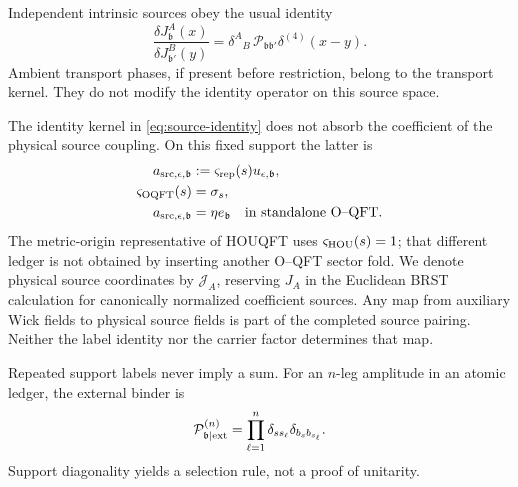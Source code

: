 \documentclass[final,5p,times,twocolumn,numbers,nopreprintline]{elsarticle}
\numberwithin{equation}{section}
\theoremstyle{definition}
\theoremstyle{remark}
\newcommand{\bb}{\mathfrak b}
\newcommand{\ee}{e_{\bb}}
\begin{document}
Independent intrinsic sources obey the usual identity
\begin{equation}
 \frac{\delta J^A_{\bb}(x)}{\delta J^B_{\bb'}(y)}
   =\delta^A{}_B\,\mathcal P_{\bb\bb'}\delta^{(4)}(x-y).
 \label{eq:source-identity}
\end{equation}
Ambient transport phases, if present before restriction, belong to the
transport kernel. They do not modify the identity operator on this
source space.

The identity kernel in \eqref{eq:source-identity} does not absorb
the coefficient of the physical source coupling. On this fixed
support the latter is
\begin{equation}
\begin{aligned}
 a_{{\rm src},\epsilon,\bb}
   &:=\varsigma_{\rm rep}(s)u_{\epsilon,\bb},\\
 \varsigma_{\rm OQFT}(s)&=\sigma_s,\\
 a_{{\rm src},\epsilon,\bb}&=\eta\ee\quad\text{in standalone O--QFT}.
\end{aligned}
 \label{eq:physical-source-carrier}
\end{equation}
The metric-origin representative of HOUQFT uses
\(\varsigma_{\rm HOU}(s)=1\); that different ledger is not obtained
by inserting another O--QFT sector fold. We denote physical source
coordinates by \(\mathcal J_A\), reserving \(J_A\) in the
Euclidean BRST calculation for canonically normalized coefficient
sources. Any map from auxiliary Wick fields to physical source
fields is part of the completed source pairing. Neither the label
identity nor the carrier factor determines that map.

Repeated support labels never imply a sum. For an
\(n\)-leg amplitude in an atomic ledger, the external binder is
\begin{equation}
 \mathcal P^{(n)}_{\bb\mid{\rm ext}}
   =\prod_{\ell=1}^n\delta_{s s_\ell}
                         \delta_{b_s b_{s_\ell}}.
 \label{eq:external-binder}
\end{equation}
Support diagonality yields a selection rule, not a proof of unitarity.
\end{document}

